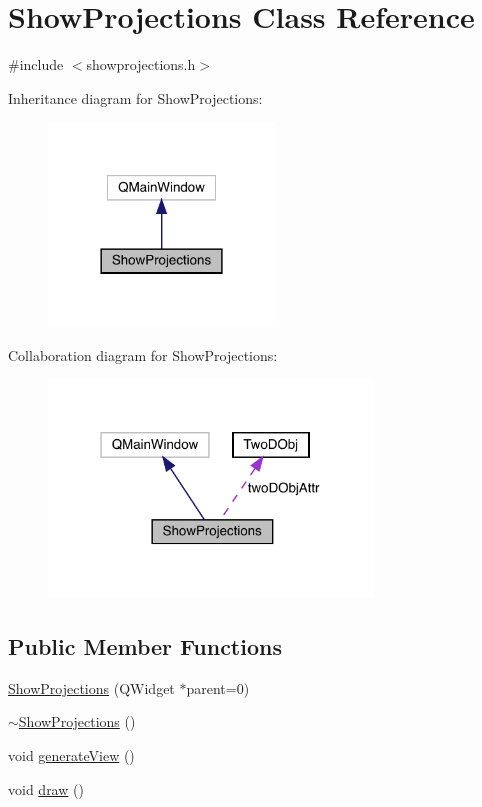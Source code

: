 \hypertarget{class_show_projections}{}\section{Show\+Projections Class Reference}
\label{class_show_projections}


{\ttfamily \#include $<$showprojections.\+h$>$}



Inheritance diagram for Show\+Projections\+:
\nopagebreak
\begin{figure}[H]
\begin{center}
\leavevmode
\includegraphics[width=170pt]{class_show_projections__inherit__graph}
\end{center}
\end{figure}


Collaboration diagram for Show\+Projections\+:
\nopagebreak
\begin{figure}[H]
\begin{center}
\leavevmode
\includegraphics[width=244pt]{class_show_projections__coll__graph}
\end{center}
\end{figure}
\subsection*{Public Member Functions}
\begin{DoxyCompactItemize}
\item 
\mbox{\hyperlink{class_show_projections_a9d5dd82bfa3dc9b28aa04e4d643cd38b}{Show\+Projections}} (Q\+Widget $\ast$parent=0)
\item 
\mbox{\hyperlink{class_show_projections_a63c65a092f0ea092e48de24798df8732}{$\sim$\+Show\+Projections}} ()
\item 
void \mbox{\hyperlink{class_show_projections_aafb940c0c1400571770261580285137c}{generate\+View}} ()
\item 
void \mbox{\hyperlink{class_show_projections_aaaf367e35dded9fbb5971b5e5a134373}{draw}} ()
\end{DoxyCompactItemize}
